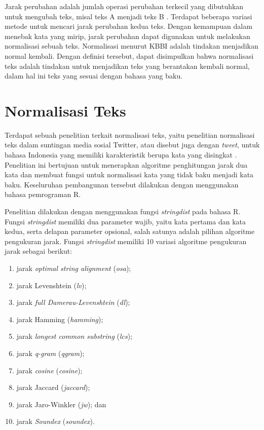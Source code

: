 Jarak perubahan adalah jumlah operasi perubahan terkecil yang dibutuhkan untuk mengubah teks, misal teks A menjadi teks B \parencite{schutze2008introduction}. Terdapat beberapa variasi metode untuk mencari jarak perubahan kedua teks. Dengan kemampuan dalam menebak kata yang mirip, jarak perubahan dapat digunakan untuk melakukan normalisasi sebuah teks. Normalisasi menurut KBBI \parencite{kbbi} adalah tindakan menjadikan normal kembali. Dengan definisi tersebut, dapat disimpulkan bahwa normalisasi teks adalah tindakan untuk menjadikan teks yang berantakan kembali normal, dalam hal ini teks yang sesuai dengan bahasa yang baku.

\section{Normalisasi Teks}

Terdapat sebuah penelitian terkait normalisasi teks, yaitu penelitian normalisasi teks dalam suntingan media sosial Twitter, atau disebut juga dengan \textit{tweet}, untuk bahasa Indonesia yang memiliki karakteristik berupa kata yang disingkat \parencite{saragih2017normalisasi}. Penelitian ini bertujuan untuk menerapkan algoritme penghitungan jarak dua kata dan membuat fungsi untuk normalisasi kata yang tidak baku menjadi kata baku. Keseluruhan pembangunan tersebut dilakukan dengan menggunakan bahasa pemrograman R.

Penelitian dilakukan dengan menggunakan fungsi \textit{stringdist} pada bahasa R. Fungsi \textit{stringdist} memiliki dua parameter wajib, yaitu kata pertama dan kata kedua, serta delapan parameter opsional, salah satunya adalah pilihan algoritme pengukuran jarak. Fungsi \textit{stringdist} memiliki 10 variasi algoritme pengukuran jarak sebagai berikut:
\begin{enumerate}
	\item jarak \textit{optimal string alignment} (\textit{osa});
	\item jarak Levenshtein (\textit{lv});
	\item jarak \textit{full Damerau-Levenshtein} (\textit{dl});
	\item jarak Hamming (\textit{hamming});
	\item jarak \textit{longest common substring} (\textit{lcs});
	\item jarak \textit{q-gram} (\textit{qgram});
	\item jarak \textit{cosine} (\textit{cosine});
	\item jarak Jaccard (\textit{jaccard});
	\item jarak Jaro-Winkler (\textit{jw}); dan
	\item jarak \textit{Soundex} (\textit{soundex}).
\end{enumerate}

